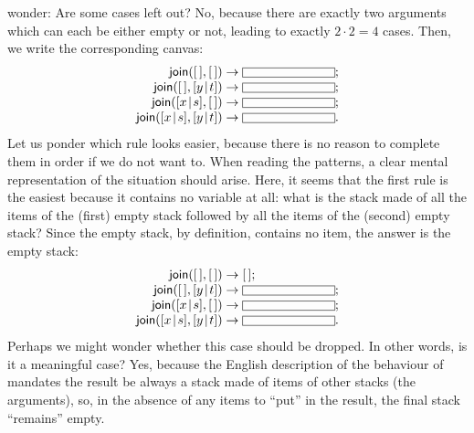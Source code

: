 wonder: Are some cases left out? No, because there are exactly two
arguments which can each be either empty or not, leading to exactly
\(2 \cdot 2 = 4\) cases. Then, we write the corresponding canvas:
\begin{equation*}
\begin{array}{r@{\;}l@{\;}l}
\fun{join}(\el,\el) & \rightarrow & \fbcode{CCCCCCCCCC};\\
\fun{join}(\el,\cons{y}{t}) & \rightarrow & \fbcode{CCCCCCCCCC};\\
\fun{join}(\cons{x}{s},\el) & \rightarrow & \fbcode{CCCCCCCCCC};\\
\fun{join}(\cons{x}{s},\cons{y}{t}) & \rightarrow & \fbcode{CCCCCCCCCC}.
\end{array}
\end{equation*}
Let us ponder which rule looks easier, because there is no reason to
complete them in order if we do not want to. When reading the
patterns, a clear mental representation of the situation should
arise. Here, it seems that the first rule is the easiest because it
contains no variable at all: what is the stack made of all the items
of the (first) empty stack followed by all the items of the (second)
empty stack? Since the empty stack, by definition, contains no item,
the answer is the empty stack:
\begin{equation*}
\begin{array}{r@{\;}l@{\;}l}
\fun{join}(\el,\el) & \rightarrow & \el;\\
\fun{join}(\el,\cons{y}{t}) & \rightarrow & \fbcode{CCCCCCCCCC};\\
\fun{join}(\cons{x}{s},\el) & \rightarrow & \fbcode{CCCCCCCCCC};\\
\fun{join}(\cons{x}{s},\cons{y}{t}) & \rightarrow & \fbcode{CCCCCCCCCC}.
\end{array}
\end{equation*}
Perhaps we might wonder whether this case should be dropped. In other
words, is it a meaningful case? Yes, because the English description
of the behaviour of  mandates the result be always a stack
made of items of other stacks (the arguments), so, in the absence of
any items to ``put'' in the result, the final stack ``remains'' empty.


